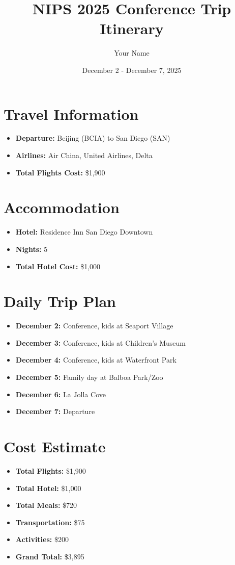 \documentclass{article}
\title{NIPS 2025 Conference Trip Itinerary}
\author{Your Name}
\date{December 2 - December 7, 2025}
\begin{document}
\maketitle

\section*{Travel Information}
\begin{itemize}
    \item \textbf{Departure:} Beijing (BCIA) to San Diego (SAN)
    \item \textbf{Airlines:} Air China, United Airlines, Delta
    \item \textbf{Total Flights Cost:} \$1,900
\end{itemize}

\section*{Accommodation}
\begin{itemize}
    \item \textbf{Hotel:} Residence Inn San Diego Downtown
    \item \textbf{Nights:} 5
    \item \textbf{Total Hotel Cost:} \$1,000
\end{itemize}

\section*{Daily Trip Plan}
\begin{itemize}
    \item \textbf{December 2:} Conference, kids at Seaport Village
    \item \textbf{December 3:} Conference, kids at Children’s Museum
    \item \textbf{December 4:} Conference, kids at Waterfront Park
    \item \textbf{December 5:} Family day at Balboa Park/Zoo
    \item \textbf{December 6:} La Jolla Cove
    \item \textbf{December 7:} Departure
\end{itemize}

\section*{Cost Estimate}
\begin{itemize}
    \item \textbf{Total Flights:} \$1,900
    \item \textbf{Total Hotel:} \$1,000
    \item \textbf{Total Meals:} \$720
    \item \textbf{Transportation:} \$75
    \item \textbf{Activities:} \$200
    \item \textbf{Grand Total:} \$3,895
\end{itemize}
\end{document}

